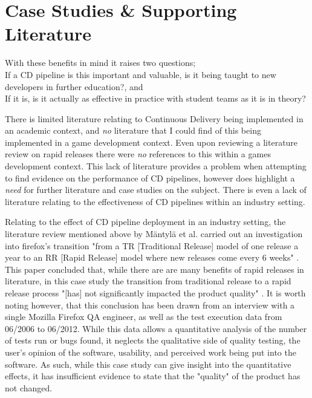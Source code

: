 \documentclass[journal]{IEEEtran}
\begin{document}
\section{Case Studies \& Supporting Literature} \label{LiteratureReview}
With these benefits in mind it raises two questions; \\
If a CD pipeline is this important and valuable, is it being taught to new developers in further education?, and \\
If it is, is it actually as effective in practice with student teams as it is in theory?

There is limited literature relating to Continuous Delivery being implemented in an academic context, and \textit{no} literature that I could find of this being implemented in a game development context. Even upon reviewing a literature review on rapid releases\cite{mantyla2015rapid} there were \textit{no} references to this within a games development context. This lack of literature provides a problem when attempting to find evidence on the performance of CD pipelines, however does highlight a \textit{need} for further literature and case studies on the subject. There is even a lack of literature relating to the effectiveness of CD pipelines within an industry setting.

Relating to the effect of CD pipeline deployment in an industry setting, the literature review mentioned above by M{\"a}ntyl{\"a} et al.\cite{mantyla2015rapid} carried out an investigation into firefox's transition "from a TR [Traditional Release] model of one release a year to an RR [Rapid Release] model where new releases come every 6 weeks" \cite[p.2]{mantyla2015rapid}. This paper concluded that, while there are are many benefits of rapid releases in literature, in this case study the transition from traditional release to a rapid release process "[has] not significantly impacted the product quality" \cite[p.40]{mantyla2015rapid}. It is worth noting however, that this conclusion has been drawn from an interview with a single Mozilla Firefox QA engineer, as well as the test execution data from 06/2006 to 06/2012. While this data allows a quantitative analysis of the number of tests run or bugs found, it neglects the qualitative side of quality testing, the user's opinion of the software, usability, and perceived work being put into the software. As such, while this case study can give insight into the quantitative effects, it has insufficient evidence to state that the "quality" of the product has not changed\cite{kan2003metrics}.
\end{document}
